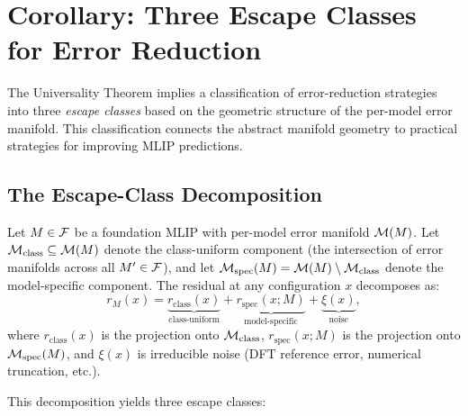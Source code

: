 \section{Corollary: Three Escape Classes for Error Reduction}\label{sec:escape}

The Universality Theorem implies a classification of error-reduction strategies into three \emph{escape classes} based on the geometric structure of the per-model error manifold. This classification connects the abstract manifold geometry to practical strategies for improving MLIP predictions.

\subsection{The Escape-Class Decomposition}

Let $M \in \mathcal{F}$ be a foundation MLIP with per-model error manifold $\mathcal{M}(M)$. Let $\mathcal{M}_{\text{class}} \subseteq \mathcal{M}(M)$ denote the class-uniform component (the intersection of error manifolds across all $M' \in \mathcal{F}$), and let $\mathcal{M}_{\text{spec}}(M) = \mathcal{M}(M) \setminus \mathcal{M}_{\text{class}}$ denote the model-specific component. The residual at any configuration $x$ decomposes as:
\begin{equation}\label{eq:residual-decomp}
    r_M(x) = \underbrace{r_{\text{class}}(x)}_{\text{class-uniform}} + \underbrace{r_{\text{spec}}(x; M)}_{\text{model-specific}} + \underbrace{\xi(x)}_{\text{noise}},
\end{equation}
where $r_{\text{class}}(x)$ is the projection onto $\mathcal{M}_{\text{class}}$, $r_{\text{spec}}(x; M)$ is the projection onto $\mathcal{M}_{\text{spec}}(M)$, and $\xi(x)$ is irreducible noise (DFT reference error, numerical truncation, etc.).

This decomposition yields three escape classes:

